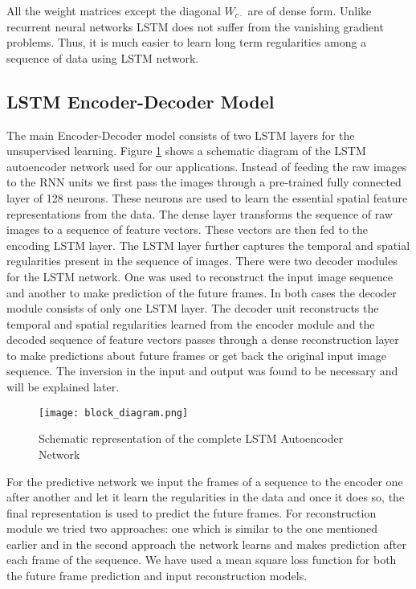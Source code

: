 \documentclass[sigconf]{acmart}
\begin{document}
All the weight matrices except the diagonal $W_{c\cdot}$ are of dense form. Unlike recurrent neural networks LSTM does not suffer from the vanishing gradient problems. Thus, it is much easier to learn long term regularities among a sequence of data using LSTM network.

\subsection{LSTM Encoder-Decoder Model}%
The main Encoder-Decoder model consists of two LSTM layers for the unsupervised learning. Figure \ref{fig3} shows a schematic diagram of the LSTM autoencoder network used for our applications. Instead of feeding the raw images to the RNN units we first pass the images through a pre-trained fully connected layer of 128 neurons. These neurons are used to learn the essential spatial feature representations from the data. The dense layer transforms the sequence of raw images to a sequence of feature vectors. These vectors are then fed to the encoding LSTM layer. The LSTM layer further captures the temporal and spatial regularities present in the sequence of images. There were two decoder modules for the LSTM network. One was used to reconstruct the input image sequence and another to make prediction of the future frames. In both cases the decoder module consists of only one LSTM layer. The decoder unit reconstructs the temporal and spatial regularities learned from the encoder module and the decoded sequence of feature vectors passes through a dense reconstruction layer to make predictions about future frames or get back the original input image sequence. The inversion in the input and output was found to be necessary and will be explained later.

\begin{figure}[h!]
        \centering
        \texttt{[image: block\_diagram.png]}

        \caption{Schematic representation of the complete LSTM Autoencoder Network}
        \label{fig3}
\end{figure}For the predictive network we input the frames of a sequence to the encoder one after another and let it learn the regularities in the data and once it does so, the final representation is used to predict the future frames. For reconstruction module we tried two approaches: one which is similar to the one mentioned earlier and in the second approach the network learns and makes prediction after each frame of the sequence. We have used a mean square loss function for both the future frame prediction and input reconstruction models.
\end{document}
